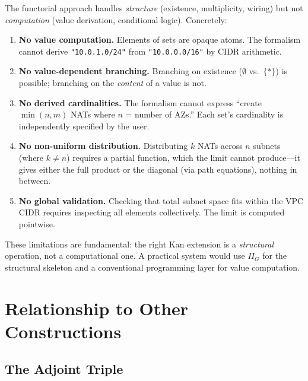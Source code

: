 \documentclass[11pt,a4paper]{article}
\theoremstyle{definition}
\theoremstyle{plain}
\begin{document}
The functorial approach handles \emph{structure} (existence, multiplicity, wiring) but not \emph{computation} (value derivation, conditional logic). Concretely:

\begin{enumerate}
  \item \textbf{No value computation.} Elements of sets are opaque atoms. The formalism cannot derive \texttt{"10.0.1.0/24"} from \texttt{"10.0.0.0/16"} by CIDR arithmetic.

  \item \textbf{No value-dependent branching.} Branching on existence ($\emptyset$ vs.\ $\{*\}$) is possible; branching on the \emph{content} of a value is not.

  \item \textbf{No derived cardinalities.} The formalism cannot express ``create $\min(n, m)$ NATs where $n$ = number of AZs.'' Each set's cardinality is independently specified by the user.

  \item \textbf{No non-uniform distribution.} Distributing $k$ NATs across $n$ subnets (where $k \neq n$) requires a partial function, which the limit cannot produce---it gives either the full product or the diagonal (via path equations), nothing in between.

  \item \textbf{No global validation.} Checking that total subnet space fits within the VPC CIDR requires inspecting all elements collectively. The limit is computed pointwise.
\end{enumerate}

These limitations are fundamental: the right Kan extension is a \emph{structural} operation, not a computational one. A practical system would use $\Pi_G$ for the structural skeleton and a conventional programming layer for value computation.

\section{Relationship to Other Constructions}

\subsection{The Adjoint Triple}
\end{document}
